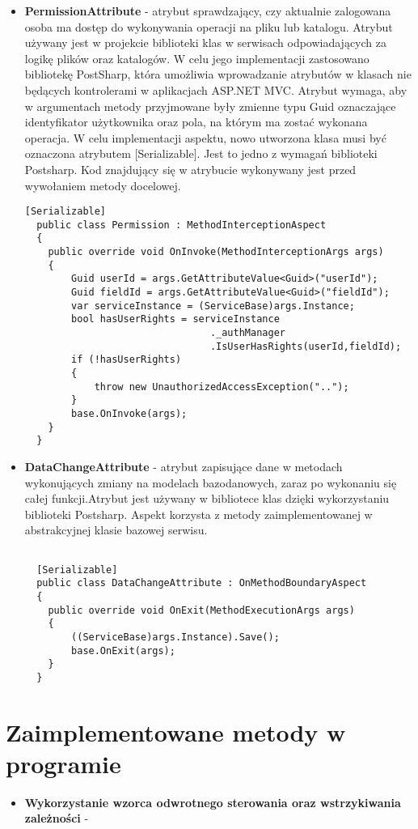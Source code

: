 \begin{itemize}
\begin{lstlisting}[caption=Wykorzystanie atrybutu AjaxAction]
  \end{lstlisting}
  \item \textbf{PermissionAttribute} - atrybut sprawdzający, czy aktualnie zalogowana osoba ma dostęp do wykonywania operacji na pliku lub katalogu. Atrybut używany jest w projekcie biblioteki klas w serwisach odpowiadających za logikę plików oraz katalogów. W celu jego implementacji zastosowano bibliotekę PostSharp, która umożliwia wprowadzanie atrybutów w klasach nie będących kontrolerami w aplikacjach ASP.NET MVC. Atrybut wymaga, aby w argumentach metody przyjmowane były zmienne typu Guid oznaczające identyfikator użytkownika oraz pola, na którym ma zostać wykonana operacja. W celu implementacji aspektu, nowo utworzona klasa musi być oznaczona atrybutem [Serializable]. Jest to jedno z wymagań biblioteki Postsharp. Kod znajdujący się w atrybucie wykonywany jest przed wywołaniem metody docelowej.
   \\
  \begin{lstlisting}[caption=Aspekt potwierdzający uprawnienia zalogowanego użytkownik do wykonywania operacji na pliku lub katalogu ]
  [Serializable]
  public class Permission : MethodInterceptionAspect
  {
  	public override void OnInvoke(MethodInterceptionArgs args)
  	{
  		Guid userId = args.GetAttributeValue<Guid>("userId");
  		Guid fieldId = args.GetAttributeValue<Guid>("fieldId");
  		var serviceInstance = (ServiceBase)args.Instance;
  		bool hasUserRights = serviceInstance
  								._authManager
  								.IsUserHasRights(userId,fieldId);
  		if (!hasUserRights)
  		{
  			throw new UnauthorizedAccessException("..");
  		}
  		base.OnInvoke(args);
  	}	
  }
  \end{lstlisting}
  \item \textbf{DataChangeAttribute} - atrybut zapisujące dane w metodach wykonujących zmiany na modelach bazodanowych, zaraz po wykonaniu się całej funkcji.Atrybut jest używany w bibliotece klas dzięki wykorzystaniu biblioteki Postsharp. Aspekt korzysta z metody zaimplementowanej w abstrakcyjnej klasie bazowej serwisu.
  \\
\begin{lstlisting}[caption=Aspekt zapisujący dane w bazie danych]
  
  [Serializable]
  public class DataChangeAttribute : OnMethodBoundaryAspect
  {
  	public override void OnExit(MethodExecutionArgs args)
  	{
  		((ServiceBase)args.Instance).Save();
  		base.OnExit(args);
  	}
  }
  \end{lstlisting}  
\end{itemize}
\newpage

\section{Zaimplementowane metody w programie}
\begin{itemize}
\item \textbf{Wykorzystanie wzorca odwrotnego sterowania oraz wstrzykiwania zależności} - 
\end{itemize}







